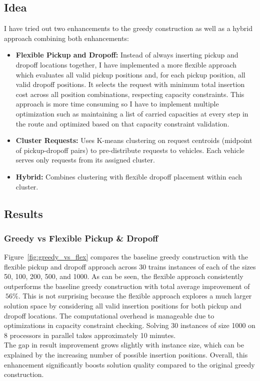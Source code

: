 \documentclass[a4paper]{scrartcl}
\begin{document}
\subsection{Idea}
I have tried out two enhancements to the greedy construction as well as a hybrid approach combining both enhancements:
\begin{itemize}
    \item \textbf{Flexible Pickup and Dropoff:} Instead of always inserting pickup and dropoff locations together,
    I have implemented a more flexible approach which evaluates all valid pickup positions and, for each pickup position,
    all valid dropoff positions.
    It selects the request with minimum total insertion cost across all position combinations, respecting capacity constraints.
    This approach is more time consuming so I have to implement multiple optimization such as maintaining a list of
    carried capacities at every step in the route and optimized based on that capacity constraint validation.

    \item \textbf{Cluster Requests:} Uses K-means clustering on request centroids (midpoint of pickup-dropoff pairs)
    to pre-distribute requests to vehicles.
    Each vehicle serves only requests from its assigned cluster.

    \item \textbf{Hybrid:} Combines clustering with flexible dropoff placement within each cluster.
\end{itemize}

\subsection{Results}
\subsubsection{Greedy vs Flexible Pickup \& Dropoff}
Figure~\ref{fig:greedy_vs_flex} compares the baseline greedy construction with the flexible pickup and dropoff approach
across 30 trains instances of each of the sizes 50, 100, 200, 500, and 1000.
As can be seen, the flexible approach consistently outperforms the baseline greedy construction with total average
improvement of $~56\%$.
This is not surprising because the flexible approach explores a much larger solution space by considering all
valid insertion positions for both pickup and dropoff locations.
The computational overhead is manageable due to optimizations in capacity constraint checking.
Solving 30 instances of size 1000 on 8 processors in parallel takes approximately 10 minutes.\\
The gap in result improvement grows slightly with instance size, which can be explained by the increasing number of possible insertion positions.
Overall, this enhancement significantly boosts solution quality compared to the original greedy construction.
\end{document}
